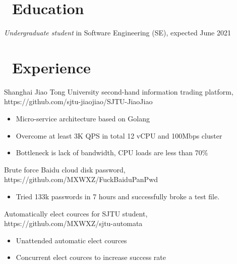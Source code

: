 \documentclass{resume}
\begin{document}



\section{\faGraduationCap\ Education}
\textit{Undergraduate student} in Software Engineering (SE), expected June 2021

\section{\faUsers\ Experience}
Shanghai Jiao Tong University second-hand information trading platform, https://github.com/sjtu-jiaojiao/SJTU-JiaoJiao
\begin{itemize}
    \item Micro-service architecture based on Golang
    \item Overcome at least 3K QPS in total 12 vCPU and 100Mbps cluster
    \item Bottleneck is lack of bandwidth, CPU loads are less than 70\%
\end{itemize}

Brute force Baidu cloud disk password, https://github.com/MXWXZ/FuckBaiduPanPwd
\begin{itemize}
    \item Tried 133k passwords in 7 hours and successfully broke a test file.
\end{itemize}

Automatically elect cources for SJTU student, https://github.com/MXWXZ/sjtu-automata
\begin{itemize}
    \item Unattended automatic elect cources
    \item Concurrent elect cources to increase success rate
\end{itemize}
\end{document}
